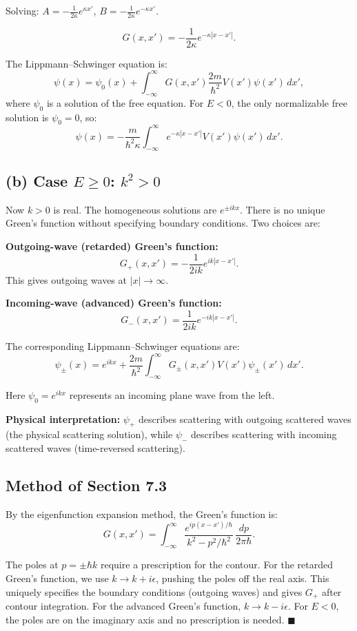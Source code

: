\documentclass[12pt]{article}
\begin{document}
Solving: $A = -\frac{1}{2\kappa}e^{\kappa x'}$, $B = -\frac{1}{2\kappa}e^{-\kappa x'}$.

\[
\boxed{G(x,x') = -\frac{1}{2\kappa}e^{-\kappa|x-x'|}.}
\]

The Lippmann--Schwinger equation is:
\[
\psi(x) = \psi_0(x) + \int_{-\infty}^{\infty} G(x,x')\frac{2m}{\hbar^2}V(x')\psi(x')\,dx',
\]
where $\psi_0$ is a solution of the free equation. For $E < 0$, the only normalizable free solution is $\psi_0 = 0$, so:
\[
\psi(x) = -\frac{m}{\hbar^2\kappa}\int_{-\infty}^{\infty} e^{-\kappa|x-x'|}V(x')\psi(x')\,dx'.
\]

\subsection*{(b) Case $E \ge 0$: $k^2 > 0$}

Now $k > 0$ is real. The homogeneous solutions are $e^{\pm ikx}$. There is no unique Green's function without specifying boundary conditions. Two choices are:

\textbf{Outgoing-wave (retarded) Green's function:}
\[
G_+(x,x') = -\frac{1}{2ik}e^{ik|x-x'|}.
\]
This gives outgoing waves at $|x| \to \infty$.

\textbf{Incoming-wave (advanced) Green's function:}
\[
G_-(x,x') = \frac{1}{2ik}e^{-ik|x-x'|}.
\]

The corresponding Lippmann--Schwinger equations are:
\[
\psi_{\pm}(x) = e^{ikx} + \frac{2m}{\hbar^2}\int_{-\infty}^{\infty}G_{\pm}(x,x')V(x')\psi_{\pm}(x')\,dx'.
\]

Here $\psi_0 = e^{ikx}$ represents an incoming plane wave from the left.

\textbf{Physical interpretation:} $\psi_+$ describes scattering with outgoing scattered waves (the physical scattering solution), while $\psi_-$ describes scattering with incoming scattered waves (time-reversed scattering).

\subsection*{Method of Section 7.3}

By the eigenfunction expansion method, the Green's function is:
\[
G(x,x') = \int_{-\infty}^{\infty}\frac{e^{ip(x-x')/\hbar}}{k^2 - p^2/\hbar^2}\,\frac{dp}{2\pi\hbar}.
\]

The poles at $p = \pm\hbar k$ require a prescription for the contour. For the retarded Green's function, we use $k \to k + i\epsilon$, pushing the poles off the real axis. This uniquely specifies the boundary conditions (outgoing waves) and gives $G_+$ after contour integration. For the advanced Green's function, $k \to k - i\epsilon$. For $E < 0$, the poles are on the imaginary axis and no prescription is needed. $\blacksquare$
\end{document}
